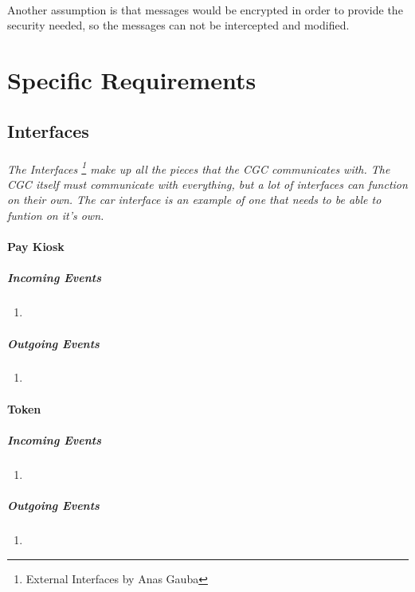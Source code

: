 \documentclass[12pt]{article}
\begin{document}
		\paragraph{} Another assumption is that messages would be encrypted in order 
		to provide the security needed, so the messages can not be intercepted and 
		modified.

\section{Specific Requirements} \label{spec} %
	\subsection{Interfaces} \label{inter}%
		\paragraph{} \textit{The Interfaces \footnote{External Interfaces by Anas Gauba} 
		make up all the pieces that the CGC communicates with. The CGC itself must communicate with everything, 
		but a lot of interfaces can function on their own. The car interface is an example of one that needs to be able to funtion on it's own.}
		
		\paragraph{Pay Kiosk}
		\textit{}
			\subparagraph{Incoming Events}
				\begin{enumerate}
					\item 
				\end{enumerate}
				
			\subparagraph{Outgoing Events}
				\begin{enumerate}
					\item 
				\end{enumerate}

		\paragraph{Token}
		\textit{}
			\subparagraph{Incoming Events}
				\begin{enumerate}
					\item 
				\end{enumerate}
				
			\subparagraph{Outgoing Events}
				\begin{enumerate}
					\item 
				\end{enumerate}
\end{document}
